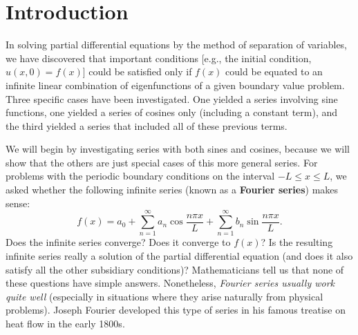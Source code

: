 \section{Introduction}
\label{sec:fourier-intro}

In solving partial differential equations by the method of separation of variables, we have discovered that important conditions [e.g., the initial condition, $u(x,0) = f(x)$] could be satisfied only if $f(x)$ could be equated to an infinite linear combination of eigenfunctions of a given boundary value problem.  Three specific cases have been investigated.  One yielded a series involving sine functions, one yielded a series of cosines only (including a constant term), and the third yielded a series that included all of these previous terms.

We will begin by investigating series with both sines and cosines, because we will show that the others are just special cases of this more general series.  For problems with the periodic boundary conditions on the interval $-L \le x \le L$, we asked whether the following infinite series (known as a \textbf{Fourier series}) makes sense:
\begin{equation}
\label{eq:fourier-series-intro}
f(x) = a_0 + \sum_{n=1}^{\infty} a_n \cos \frac{n\pi x}{L} + \sum_{n=1}^{\infty} b_n \sin \frac{n\pi x}{L}.
\end{equation}
Does the infinite series converge?  Does it converge to $f(x)$?  Is the resulting infinite series really a solution of the partial differential equation (and does it also satisfy all the other subsidiary conditions)?  Mathematicians tell us that none of these questions have simple answers.  Nonetheless, \textit{Fourier series usually work quite well} (especially in situations where they arise naturally from physical problems).  Joseph Fourier developed this type of series in his famous treatise on heat flow in the early 1800s.

